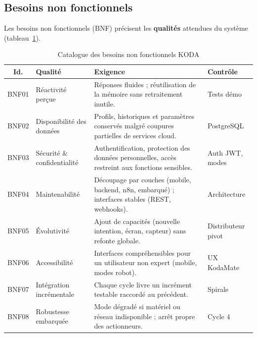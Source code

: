 \documentclass[a4paper,12pt]{report}
\begin{document}
	
	\subsection{Besoins non fonctionnels}
	
	Les besoins non fonctionnels (BNF) précisent les \textbf{qualités} attendues du
	système (tableau~\ref{tab:ch2-bnf}).
	
	\begin{table}[H]
		\centering
		\caption{Catalogue des besoins non fonctionnels KODA}
		\label{tab:ch2-bnf}
		\small
		\renewcommand{\arraystretch}{1.2}
		\begin{tabularx}{\textwidth}{|c|>{\raggedright\arraybackslash}p{3.4cm}|>{\raggedright\arraybackslash}X|>{\raggedright\arraybackslash}p{2.4cm}|}
			\hline
			\textbf{Id.} & \textbf{Qualité} & \textbf{Exigence} & \textbf{Contrôle} \\
			\hline
			BNF01 & Réactivité perçue & Réponses fluides ; réutilisation de la mémoire sans retraitement inutile. & Tests démo \\
			\hline
			BNF02 & Disponibilité des données & Profils, historiques et paramètres conservés malgré coupures partielles de services cloud. & PostgreSQL \\
			\hline
			BNF03 & Sécurité \& confidentialité & Authentification, protection des données personnelles, accès restreint aux fonctions sensibles. & Auth JWT, modes \\
			\hline
			BNF04 & Maintenabilité & Découpage par couches (mobile, backend, n8n, embarqué) ; interfaces stables (REST, webhooks). & Architecture \\
			\hline
			BNF05 & Évolutivité & Ajout de capacités (nouvelle intention, écran, capteur) sans refonte globale. & Distributeur pivot \\
			\hline
			BNF06 & Accessibilité & Interfaces compréhensibles pour un utilisateur non expert (mobile, modes robot). & UX KodaMate \\
			\hline
			BNF07 & Intégration incrémentale & Chaque cycle livre un incrément testable raccordé au précédent. & Spirale \\
			\hline
			BNF08 & Robustesse embarquée & Mode dégradé si matériel ou réseau indisponible ; arrêt propre des actionneurs. & Cycle 4 \\
			\hline
		\end{tabularx}
	\end{table}
	
\end{document}
